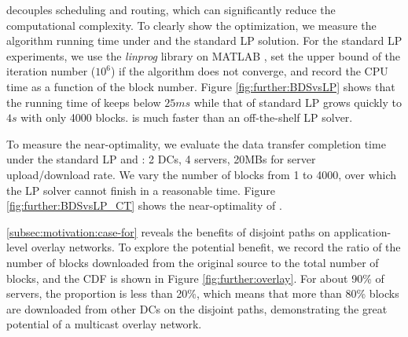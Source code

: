 \label{subsubsec:evaluation:depth}

 \name decouples scheduling and routing, which can significantly reduce the computational complexity. To clearly show the optimization, we measure the algorithm running time under \name and the standard LP solution. For the standard LP experiments, we use the \textit{linprog} library on MATLAB \cite{mathworks}, set the upper bound of the iteration number ($10^6$) if the algorithm does not converge, and record the CPU time as a function of the block number. Figure \ref{fig:further:BDSvsLP} shows that the running time of \name keeps below $25ms$ while that of standard LP grows quickly to $4s$ with only 4000 blocks. %
\name is much faster than an off-the-shelf LP solver.

 To measure the near-optimality, we evaluate the data transfer completion time under the standard LP and \name: 2 DCs, 4 servers, 20MBs for server upload/download rate.
We vary the number of blocks from 1 to 4000, over which the LP solver cannot finish in a reasonable time. Figure \ref{fig:further:BDSvsLP_CT} shows the near-optimality of \name.%


 \Section\ref{subsec:motivation:case-for} reveals the benefits of disjoint paths on application-level overlay networks. To explore the potential benefit, we record the ratio of the number of blocks downloaded from the original source to the total number of blocks, and the CDF is shown in Figure \ref{fig:further:overlay}. For about 90\% of servers, the proportion is less than 20\%, which means that more than 80\% blocks are downloaded from other DCs on the disjoint paths, demonstrating the great potential of a multicast overlay network.




